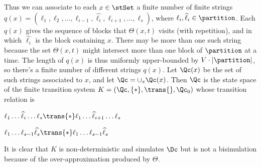 \begin{prf}
	Thus we can associate to each $x\in \stSet$ a finite number of finite strings $q(x) = (\ell_1,\ell_2,\ldots,\ell_{i-1},\widehat{\ell_i},\ell_{i+1},\ldots,\ell_s)$, where $\ell_i,\widehat{\ell}_i \in \partition$.
	Each $q(x)$ gives the sequence of blocks that $\Theta(x,t)$ visits (with repetition), and in which $\widehat{\ell_i}$ is the block containing $x$.
	There may be more than one such string because the set $\Theta(x,t)$ might intersect more than one block of $\partition$ at a time.		
	The length of $q(x)$ is thus uniformly upper-bounded by $V\cdot |\partition|$, so there's a finite number of different strings $q(x)$. 
	Let $\Qc(x)$ be the set of such strings associated to $x$, and let $\Qc = \cup_x \Qc(x)$.
	Then $\Qc$ is the state space of the finite transition system $K = (\Qc,\{*\},\trans{},\Qc_0)$ whose transition relation is 
	\begin{compactitem}
		\item $\ell_1\ldots\widehat{\ell}_i\ldots\ell_s \trans{*} \ell_1\ldots\widehat{\ell}_{i+1}\ldots\ell_s$
		\item $\ell_1\ldots\ell_{s-1} \widehat{\ell_s} \trans{*} \ell_1\ldots\ell_{s-1} \widehat{\ell}_s$
	\end{compactitem}

	It is clear that $K$ is non-deterministic and simulates $\Dc$ but is not a bisimulation because of the over-approximation produced by $\Theta$.	 
\end{prf} 